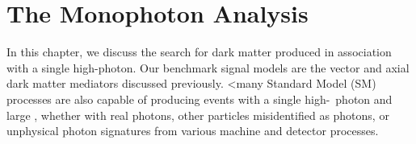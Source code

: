 \chapter{The Monophoton Analysis}
\label{chap:analysis}

In this chapter, we discuss the search for dark matter produced in association with a single high-\pt photon.
Our benchmark signal models are the vector and axial dark matter mediators discussed previously. 
<many Standard Model (SM) processes are also capable of producing events with a single high-\pt\ photon and large \met, whether with real photons, other particles misidentified as photons, or unphysical photon signatures from various  machine and detector processes. 

